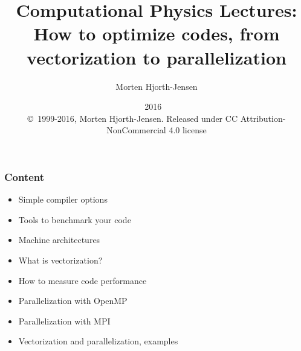\documentclass{beamer}
\begin{document}

\newcommand{\exercisesection}[1]{\subsection*{#1}}







\title{Computational Physics Lectures: How to optimize codes, from vectorization to parallelization}


\author{Morten Hjorth-Jensen}

\date{2016
\ \\ 
{\tiny \copyright\ 1999-2016, Morten Hjorth-Jensen. Released under CC Attribution-NonCommercial 4.0 license}
}

\begin{frame}
\titlepage
\end{frame}

\begin{frame}
\frametitle{Content}

\begin{itemize}
\item Simple compiler options 

\item Tools to benchmark your code

\item Machine architectures

\item What is vectorization?

\item How to measure code performance

\item Parallelization with OpenMP

\item Parallelization with MPI

\item Vectorization and parallelization, examples
\end{itemize}

\noindent
\end{frame}
\end{document}
